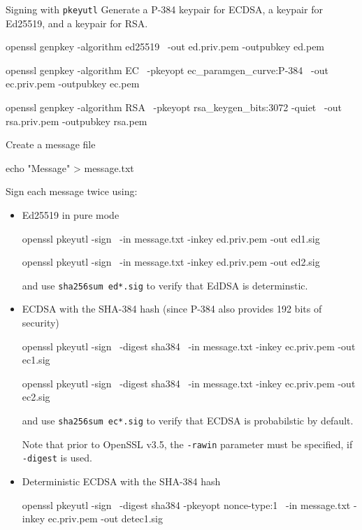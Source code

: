 \documentclass{practice}
\begin{document}
\begin{task}{Signing with \texttt{pkeyutl}}
  Generate a P-384 keypair for ECDSA, a keypair for Ed25519, and a keypair for RSA.

  \begin{cmdblock}
openssl genpkey -algorithm ed25519 \
  -out ed.priv.pem -outpubkey ed.pem
  \end{cmdblock}
  \begin{cmdblock}
openssl genpkey -algorithm EC \
  -pkeyopt ec_paramgen_curve:P-384 \
  -out ec.priv.pem -outpubkey ec.pem
  \end{cmdblock}
  \begin{cmdblock}
openssl genpkey -algorithm RSA \
  -pkeyopt rsa_keygen_bits:3072 -quiet \
  -out rsa.priv.pem -outpubkey rsa.pem
  \end{cmdblock}

  Create a message file
  \begin{cmdblock}
echo "Message" > message.txt
  \end{cmdblock}

  Sign each message twice using:
  \begin{itemize}
    \item Ed25519 in pure mode
    \begin{cmdblock}
openssl pkeyutl -sign \
  -in message.txt -inkey ed.priv.pem -out ed1.sig

openssl pkeyutl -sign \
  -in message.txt -inkey ed.priv.pem -out ed2.sig
    \end{cmdblock}
    and use \texttt{sha256sum ed*.sig} to verify that EdDSA is determinstic.

    \item ECDSA with the SHA-384 hash (since P-384 also provides 192 bits of security)
    \begin{cmdblock}
openssl pkeyutl -sign \
  -digest sha384 \
  -in message.txt -inkey ec.priv.pem -out ec1.sig

openssl pkeyutl -sign \
  -digest sha384 \
  -in message.txt -inkey ec.priv.pem -out ec2.sig
    \end{cmdblock}
    and use \texttt{sha256sum ec*.sig} to verify that ECDSA is probabilstic by default.

    Note that prior to OpenSSL v3.5, the \texttt{-rawin} parameter must be specified, if \texttt{-digest} is used.

    \item Deterministic ECDSA with the SHA-384 hash
    \begin{cmdblock}
openssl pkeyutl -sign \
  -digest sha384 -pkeyopt nonce-type:1 \
  -in message.txt -inkey ec.priv.pem -out detec1.sig


\end{cmdblock}
\end{itemize}
\end{task}
\end{document}

